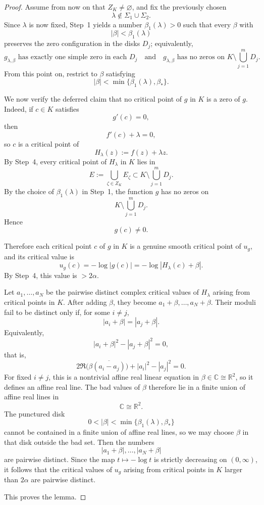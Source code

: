 \documentclass[12pt]{amsart}
\theoremstyle{definition}
\theoremstyle{remark}
\begin{document}
\begin{proof}
Assume from now on that $Z_K\neq\varnothing$, and fix the previously chosen
\[
\lambda\notin \Sigma_1\cup\Sigma_2.
\]
Since $\lambda$ is now fixed, Step~1 yields a number $\beta_1(\lambda)>0$ such that every
$\beta$ with
\[
|\beta|<\beta_1(\lambda)
\]
preserves the zero configuration in the disks $D_j$; equivalently,
\[
g_{\lambda,\beta}\text{ has exactly one simple zero in each }D_j
\quad\text{and}\quad
g_{\lambda,\beta}\text{ has no zeros on }K\setminus\bigcup_{j=1}^m D_j.
\]
From this point on, restrict to $\beta$ satisfying
\[
|\beta|<\min\{\beta_1(\lambda),\beta_*\}.
\]

We now verify the deferred claim that no critical point of $g$ in $K$ is a zero of $g$.
Indeed, if $c\in K$ satisfies
\[
g'(c)=0,
\]
then
\[
f'(c)+\lambda=0,
\]
so $c$ is a critical point of
\[
H_\lambda(z):=f(z)+\lambda z.
\]
By Step~4, every critical point of $H_\lambda$ in $K$ lies in
\[
E:=\bigcup_{\zeta\in Z_K} E_\zeta \subset K\setminus\bigcup_{j=1}^m D_j.
\]
By the choice of $\beta_1(\lambda)$ in Step~1, the function $g$ has no zeros on
\[
K\setminus\bigcup_{j=1}^m D_j.
\]
Hence
\[
g(c)\neq 0.
\]

Therefore each critical point $c$ of $g$ in $K$ is a genuine smooth critical point of $u_g$, and
its critical value is
\[
u_g(c)=-\log|g(c)|=-\log|H_\lambda(c)+\beta|.
\]
By Step~4, this value is $>2\alpha$.

Let $a_1,\dots,a_N$ be the pairwise distinct complex critical
values of $H_\lambda$ arising from critical points in $K$. After adding $\beta$, they become $a_1+\beta,\dots,a_N+\beta$.
Their moduli fail to be distinct only if, for some $i\neq j$,
\[
 |a_i+\beta|=|a_j+\beta|.
\]
Equivalently,
\[
 |a_i+\beta|^2-|a_j+\beta|^2=0,
\]
that is,
\[
 2\Re\bigl(\beta \overline{(a_i-a_j)}\bigr)+|a_i|^2-|a_j|^2=0.
\]
For fixed $i\neq j$, this is a nontrivial affine real linear equation in $\beta\in\mathbb{C}\cong\mathbb{R}^2$, so it defines an affine
real line. The bad values of $\beta$ therefore lie in a finite union of affine real lines in
\[
\mathbb C\cong \mathbb R^2.
\]
The punctured disk
\[
0<|\beta|<\min\{\beta_1(\lambda),\beta_*\}
\]
cannot be contained in a finite union of affine real lines, so we may choose $\beta$ in that
disk outside the bad set. Then the numbers
\[
|a_1+\beta|,\dots,|a_N+\beta|
\]
are pairwise distinct. Since the map $t\mapsto -\log t$ is strictly decreasing on $(0,\infty)$,
it follows that the critical values of $u_g$ arising from critical points in $K$ larger than
$2\alpha$ are pairwise distinct.

\indent This proves the lemma. \end{proof}
\end{document}
